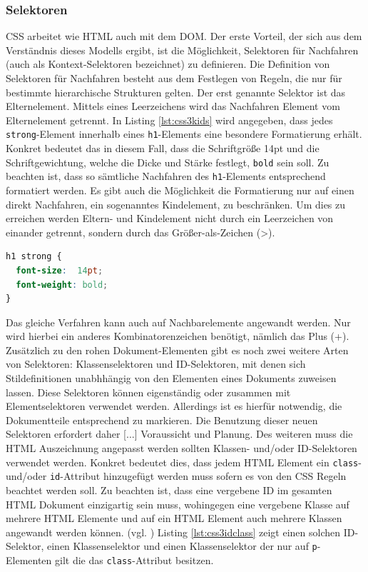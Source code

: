 \subsubsection{Selektoren} CSS arbeitet wie HTML auch mit dem DOM. \glqq Der erste Vorteil, der sich aus dem Verständnis dieses Modells ergibt, ist die Möglichkeit, Selektoren für Nachfahren (auch als Kontext-Selektoren bezeichnet) zu definieren. Die Definition von Selektoren für Nachfahren besteht aus dem Festlegen von Regeln, die nur für bestimmte hierarchische Strukturen gelten.\grqq{}\cite[S.48]{MeyeCasc2005} Der erst genannte Selektor ist das Elternelement. Mittels eines Leerzeichens wird das Nachfahren Element vom Elternelement getrennt. In Listing \ref{lst:css3kids} wird angegeben, dass jedes \texttt{strong}-Element innerhalb eines \texttt{h1}-Elements eine besondere Formatierung erhält. Konkret bedeutet das in diesem Fall, dass die Schriftgröße 14pt und die Schriftgewichtung, welche die Dicke und Stärke festlegt, \texttt{bold} sein soll. Zu beachten ist, dass so sämtliche Nachfahren des \texttt{h1}-Elements entsprechend formatiert werden. Es gibt auch die Möglichkeit die Formatierung nur auf einen direkt Nachfahren, ein sogenanntes Kindelement, zu beschränken. Um dies zu erreichen werden Eltern- und Kindelement nicht durch ein Leerzeichen von einander getrennt, sondern durch das Größer-als-Zeichen (\textgreater).

\vspace{1em}
\begin{lstlisting}[language=CSS, caption=CSS3 Selektoren für Nachfahren, label=lst:css3kids]
h1 strong {
  font-size:  14pt;
  font-weight: bold;  
}
\end{lstlisting}

Das gleiche Verfahren kann auch auf Nachbarelemente angewandt werden. Nur wird hierbei ein anderes Kombinatorenzeichen benötigt, nämlich das Plus (+).\\
\glqq Zusätzlich zu den rohen Dokument-Elementen gibt es noch zwei weitere Arten von Selektoren: Klassenselektoren und ID-Selektoren, mit denen sich Stildefinitionen unabhhängig von den Elementen eines Dokuments zuweisen lassen. Diese Selektoren können eigenständig oder zusammen mit Elementselektoren verwendet werden. Allerdings ist es hierfür notwendig, die Dokumentteile entsprechend zu markieren. Die Benutzung dieser neuen Selektoren erfordert daher [...] Voraussicht und Planung.\grqq{}\cite[S.34ff]{MeyeCasc2005} Des weiteren muss die HTML Auszeichnung angepasst werden sollten Klassen- und/oder ID-Selektoren verwendet werden. Konkret bedeutet dies, dass jedem HTML Element ein \texttt{class}- und/oder \texttt{id}-Attribut hinzugefügt werden muss sofern es von den CSS Regeln beachtet werden soll. Zu beachten ist, dass eine vergebene ID im gesamten HTML Dokument einzigartig sein muss, wohingegen eine vergebene Klasse auf mehrere HTML Elemente und auf ein HTML Element auch mehrere Klassen angewandt werden können. (vgl. \cite{W3ScCss2014}) Listing \ref{lst:css3idclass} zeigt einen solchen ID-Selektor, einen Klassenselektor und einen Klassenselektor der nur auf \texttt{p}-Elementen gilt die das \texttt{class}-Attribut besitzen.

